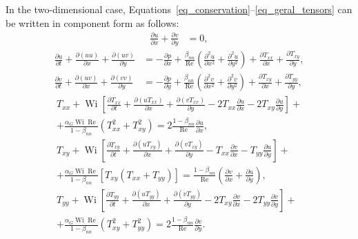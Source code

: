 \documentclass[preprint, 12pt]{elsarticle}
\begin{document}
In the two-dimensional case, Equations~\eqref{eq_conservation}--\eqref{eq_geral_tensors} can be written in component form as follows:
\begin{align}
    \frac{\partial u}{\partial x}+\frac{\partial v}{\partial y}&=0,\label{cont_bidime}
\end{align}
\begin{subequations}
\begin{align}
    \frac{\partial u}{\partial t}+\frac{\partial(u u)}{\partial x}+\frac{\partial(u v)}{\partial y} &= -\frac{\partial p}{\partial x}+\frac{\beta_{nn}}{\operatorname{Re}}\left(\frac{\partial^2 u}{\partial x^2}+\frac{\partial^2 u}{\partial y^2}\right)+\frac{\partial T_{x x}}{\partial x}+\frac{\partial T_{x y}}{\partial y},\label{movi_x_bidime} \\[7mm]
    \frac{\partial v}{\partial t} + \frac{\partial(u v)}{\partial x} + \frac{\partial(v v)}{\partial y} &= -\frac{\partial p}{\partial y}+\frac{\beta_{nn}}{\operatorname{Re}}\left(\frac{\partial^2 v}{\partial x^2}+\frac{\partial^2 v}{\partial y^2}\right)+\frac{\partial T_{x y}}{\partial x}+\frac{\partial T_{yy}}{\partial y},\label{movi_y_bidime}
\end{align}
\end{subequations}
\begin{subequations}
\begin{align}
    T_{xx} + \operatorname{Wi}\left[\frac{\partial T_{xx}}{\partial t} + \frac{\partial (uT_{xx})}{\partial x} + \frac{\partial (vT_{xx})}{\partial y} - 2T_{xx}\frac{\partial u}{\partial x} - 2T_{xy}\frac{\partial u}{\partial y}\right] + \nonumber\\ + \frac{\alpha_{G}\operatorname{Wi}\operatorname{Re}}{1 - \beta_{nn}}\left(T_{xx}^{2} + T_{xy}^{2}\right) = 2 \frac{1 - \beta_{nn}}{\operatorname{Re}}\frac{\partial u}{\partial x},\label{eq_gies_txx}\\[7mm]
    T_{xy} + \operatorname{Wi}\left[\frac{\partial T_{xy}}{\partial t} + \frac{\partial (uT_{xy})} {\partial x} + \frac{\partial (vT_{xy})}{\partial y} - T_{xx}\frac{\partial v}{\partial x} - T_{yy}\frac{\partial u}{\partial y}\right] + \nonumber \\ + \frac{\alpha_{G}\operatorname{Wi}\operatorname{Re}}{1 - \beta_{nn}}\left[T_{xy}\left(T_{xx} + T_{yy}\right)\right] = \frac{1 - \beta_{nn}}{\operatorname{Re}}\left(\frac{\partial v}{\partial x} + \frac{\partial u}{\partial y}\right),\label{eq_gies_txy}\\[7mm]
    T_{yy} + \operatorname{Wi}\left[\frac{\partial T_{yy}}{\partial t} + \frac{\partial (uT_{yy})}{\partial x} + \frac{\partial (vT_{yy})}{\partial y} - 2T_{xy}\frac{\partial v}{\partial x} - 2T_{yy}\frac{\partial v}{\partial y}\right] + \nonumber \\ + \frac{\alpha_{G}\operatorname{Wi}\operatorname{Re}}{1 - \beta_{nn}}\left(T_{xy}^{2} + T_{yy}^{2}\right) = 2\frac{1 - \beta_{nn}}{\operatorname{Re}}\frac{\partial v}{\partial y}.\label{eq_gies_tyy}
\end{align}
\end{subequations}
\end{document}
